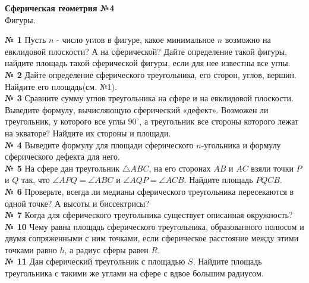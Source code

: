 


    \begin{center}
        \textbf{Сферическая геометрия №4}\\
        Фигуры.
    \end{center}

    \textbf{№ 1}
    Пусть $n$ - число углов в фигуре, какое минимальное $n$ возможно на евклидовой плоскости?
    А на сферической?
    Дайте определение такой фигуры, найдите площадь такой сферической фигуры, если для нее известны все углы.\\


    \textbf{№ 2}
    Дайте определение сферического треугольника, его сторон, углов, вершин.
    Найдите его площадь(см. №1).\\


    \textbf{№ 3}
    Сравните сумму углов треугольника на сфере и на евклидовой плоскости.
    Выведите формулу, вычисляющую сферический «дефект».
    Возможен ли треугольник, у которого все углы $90^\circ$,
    а треугольник все стороны которого лежат на экваторе?
    Найдите их стороны и площади.\\


    \textbf{№ 4}
    Выведите формулу для площади сферического $n$-угольника и формулу сферического дефекта для него.\\


    \textbf{№ 5}
    На сфере дан треугольник $\triangle ABC$, на его сторонах $AB$ и $AC$ взяли
    точки $P$ и $Q$ так, что $\angle APQ = \angle ABC$ и $\angle AQP = \angle ACB$.
    Найдите площадь $PQCB$.\\


    \textbf{№ 6}
    Проверьте, всегда ли медианы сферического треугольника пересекаются в одной точке?
    А высоты и биссектрисы?\\


    \textbf{№ 7}
    Когда для сферического треугольника существует описанная окружность?\\


    \textbf{№ 10}
    Чему равна площадь сферического треугольника, образованного полюсом и двумя сопряженными с ним точками,
    если сферическое расстояние между этими точками равно $h$, а радиус сферы равен $R$.\\


     \textbf{№ 11}
    Дан сферический треугольник с площадью $S$.
    Найдите площадь треугольника с такими же углами на сфере с вдвое большим радиусом.\\


